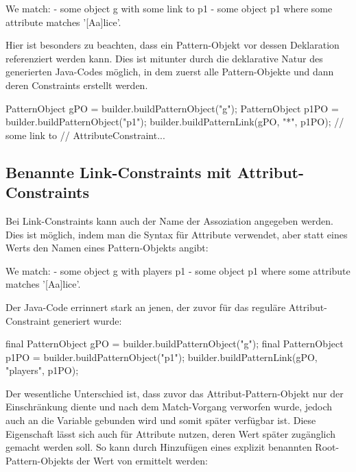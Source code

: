 \begin{mdcodeblock}
    We match:
    - some object g with some link to p1
    - some object p1 where some attribute matches '[Aa]lice'.
\end{mdcodeblock}

Hier ist besonders zu beachten, dass ein Pattern-Objekt vor dessen Deklaration referenziert werden kann.
Dies ist mitunter durch die deklarative Natur des generierten Java-Codes möglich,
in dem zuerst alle Pattern-Objekte und dann deren Constraints erstellt werden.

\begin{jcodeblock}
    PatternObject gPO = builder.buildPatternObject("g");
    PatternObject p1PO = builder.buildPatternObject("p1");
    builder.buildPatternLink(gPO, "*", p1PO); // some link to
    // AttributeConstraint...
\end{jcodeblock}

\subsection{Benannte Link-Constraints mit Attribut-Constraints}

Bei Link-Constraints kann auch der Name der Assoziation angegeben werden.
Dies ist möglich, indem man die Syntax für Attribute verwendet,
aber statt eines Werts den Namen eines Pattern-Objekts angibt:

\begin{mdcodeblock}
    We match:
    - some object g with players p1
    - some object p1 where some attribute matches '[Aa]lice'.
\end{mdcodeblock}

Der Java-Code errinnert stark an jenen, der zuvor für das reguläre Attribut-Constraint generiert wurde:

\begin{jcodeblock}
    final PatternObject gPO = builder.buildPatternObject("g");
    final PatternObject p1PO = builder.buildPatternObject("p1");
    builder.buildPatternLink(gPO, "players", p1PO);
\end{jcodeblock}

Der wesentliche Unterschied ist, dass zuvor das Attribut-Pattern-Objekt  nur der Einschränkung diente und nach dem Match-Vorgang verworfen wurde,
 jedoch auch an die Variable  gebunden wird und somit später verfügbar ist.
Diese Eigenschaft lässt sich auch für Attribute nutzen, deren Wert später zugänglich gemacht werden soll.
So kann durch Hinzufügen eines explizit benannten Root-Pattern-Objekts der Wert von  ermittelt werden:

